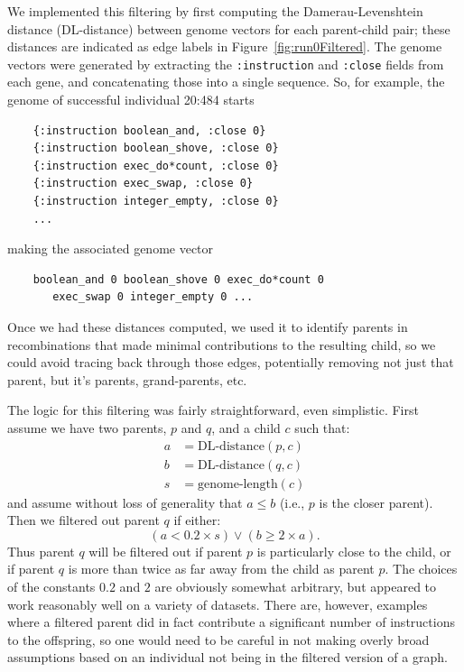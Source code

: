 We implemented this filtering by first computing the Damerau-Levenshtein 
distance (DL-distance)
between genome vectors for each parent-child pair; these distances
are indicated as edge labels in Figure~\ref{fig:run0Filtered}. The genome
vectors were generated by extracting the \texttt{:instruction} and 
\texttt{:close} fields from each gene, and concatenating those into a
single sequence. So, for example, the genome of successful individual
20:484 starts

\begin{verbatim}
	{:instruction boolean_and, :close 0} 
	{:instruction boolean_shove, :close 0} 
	{:instruction exec_do*count, :close 0} 
	{:instruction exec_swap, :close 0} 
	{:instruction integer_empty, :close 0}
	...
\end{verbatim}

making the associated genome vector

\begin{verbatim}
	boolean_and 0 boolean_shove 0 exec_do*count 0 
	   exec_swap 0 integer_empty 0 ...
\end{verbatim}


Once we had these distances computed, we used it to identify parents in
recombinations that made minimal contributions to the resulting child, so
we could avoid tracing back through those edges, potentially removing not
just that parent, but it's parents, grand-parents, etc. 

The logic for this filtering was fairly straightforward, even simplistic.
First assume we have two parents, $p$ and $q$, and a child $c$ such that:
\begin{align*}
	a & = \textrm{DL-distance}(p, c) \\
	b & = \textrm{DL-distance}(q, c) \\
	s & = \textrm{genome-length}(c)
\end{align*}
and assume without loss of generality that $a \leq b$ (i.e., $p$ is the
closer parent). Then we filtered out parent $q$ if either:
\[
	(a < 0.2 \times s) \lor (b \geq 2 \times a).
\]
Thus parent $q$ will be filtered out if parent $p$ is particularly close to
the child, or if parent $q$ is more than twice as far away from the child as
parent $p$. The choices of the constants $0.2$ and $2$ are obviously somewhat
arbitrary, but appeared to work reasonably well on a variety of datasets. 
There are,
however, examples where a filtered parent did in fact contribute a significant
number of instructions to the offspring, so one would need to be careful in not
making overly broad assumptions based on an individual not being in the filtered
version of a graph.

